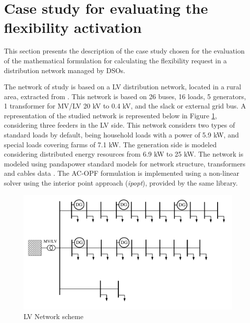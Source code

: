 \section{Case study for evaluating the flexibility activation}

This section presents the description of the case study chosen for the evaluation of the mathematical formulation for calculating the flexibility request in a distribution network managed by DSOs. 

The network of study is based on a LV distribution network, located in a rural area, extracted from \cite{Linder2014}. This network is based on 26 buses, 16 loads, 5 generators, 1 transformer for MV/LV 20 kV to 0.4 kV, and the slack or external grid bus. A representation of the studied network is represented below in Figure \ref{fig:case_study_LV}, considering three feeders in the LV side. 
This network considers two types of standard loads by default, being household loads with a power of 5.9 kW, and special loads covering farms of 7.1 kW. The generation side is modeled considering distributed energy resources from 6.9 kW to 25 kW. The network is modeled using pandapower standard models for network structure, transformers and cables data \cite{Thurner_2018}. The AC-OPF formulation is implemented using a non-linear solver using the interior point approach (\textit{ipopt}), provided by the same library. 
\vspace{10mm}
\begin{figure}[htbp]
	\centering
	\includegraphics[width=1\columnwidth ]{ChapterOPF_DSO/Figures/LV_network_2.pdf}
		\caption{LV Network scheme}
	\label{fig:case_study_LV}  
\end{figure}

\newpage
